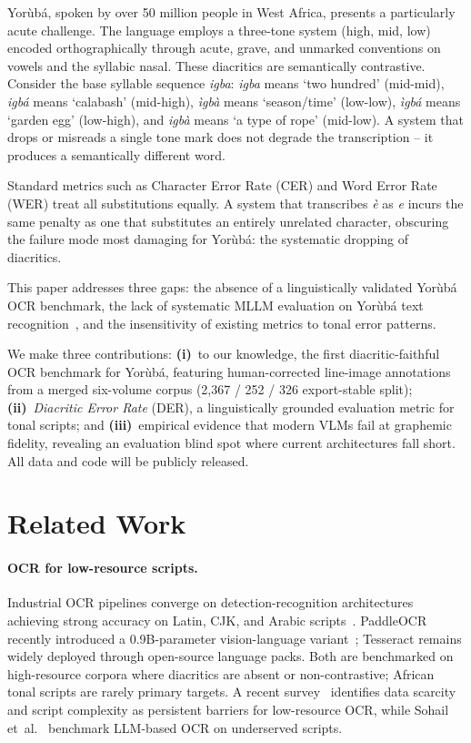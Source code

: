 \documentclass{article}
\newcommand{\Yoruba}{Yor\`ub\'a}
\begin{document}
\Yoruba{}, spoken by over 50 million people in West Africa, presents a particularly acute challenge. The language employs a three-tone system (high, mid, low) encoded orthographically through acute, grave, and unmarked conventions on vowels and the syllabic nasal. These diacritics are semantically contrastive. Consider the base syllable sequence \emph{igba}: \emph{igba} means `two hundred' (mid-mid), \emph{igb\'a} means `calabash' (mid-high), \emph{\`igb\`a} means `season/time' (low-low), \emph{\`igb\'a} means `garden egg' (low-high), and \emph{igb\`a} means `a type of rope' (mid-low). A system that drops or misreads a single tone mark does not degrade the transcription -- it produces a semantically different word.

Standard metrics such as Character Error Rate (CER) and Word Error Rate (WER) treat all substitutions equally. A system that transcribes \emph{\`e} as \emph{e} incurs the same penalty as one that substitutes an entirely unrelated character, obscuring the failure mode most damaging for \Yoruba{}: the systematic dropping of diacritics.

This paper addresses three gaps: the absence of a linguistically validated \Yoruba{} OCR benchmark, the lack of systematic MLLM evaluation on \Yoruba{} text recognition~\cite{sohail2024deciphering}, and the insensitivity of existing metrics to tonal error patterns.

We make three contributions: \textbf{(i)}~to our knowledge, the first diacritic-faithful OCR benchmark for \Yoruba{}, featuring human-corrected line-image annotations from a merged six-volume corpus (2{,}367 / 252 / 326 export-stable split); \textbf{(ii)}~\emph{Diacritic Error Rate} (DER), a linguistically grounded evaluation metric for tonal scripts; and \textbf{(iii)}~empirical evidence that modern VLMs fail at graphemic fidelity, revealing an evaluation blind spot where current architectures fall short. All data and code will be publicly released.

\section{Related Work}

\paragraph{OCR for low-resource scripts.}
Industrial OCR pipelines converge on detection-recognition architectures achieving strong accuracy on Latin, CJK, and Arabic scripts~\cite{du2020ppocr,du2021ppocrv2,smith2007tesseract}. PaddleOCR recently introduced a 0.9B-parameter vision-language variant~\cite{cui2026paddleocrvl}; Tesseract remains widely deployed through open-source language packs. Both are benchmarked on high-resource corpora where diacritics are absent or non-contrastive; African tonal scripts are rarely primary targets. A recent survey~\cite{agarwal2024ocr} identifies data scarcity and script complexity as persistent barriers for low-resource OCR, while Sohail et~al.~ benchmark LLM-based OCR on underserved scripts.
\end{document}
